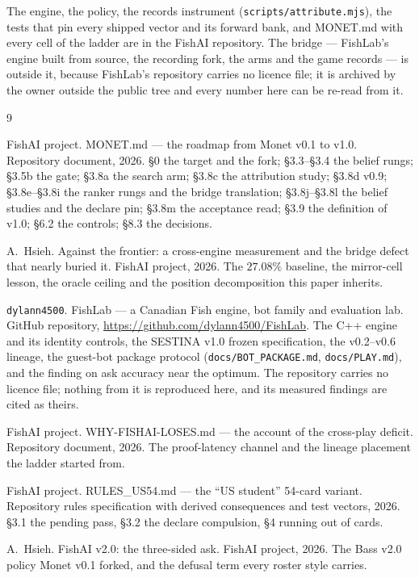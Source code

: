 \documentclass[11pt]{article}
\newcommand{\code}[1]{\texttt{#1}}
\newcommand{\monet}{MONET.md}
\begin{document}
The engine, the policy, the records instrument (\code{scripts/attribute.mjs}), the tests that pin
every shipped vector and its forward bank, and \monet{} with every cell of the ladder are in the
FishAI repository. The bridge --- FishLab's engine built from source, the recording fork, the arms and
the game records --- is outside it, because FishLab's repository carries no licence file; it is
archived by the owner outside the public tree and every number here can be re-read from it.

\begin{thebibliography}{9}
\footnotesize

FishAI project. MONET.md --- the roadmap from Monet v0.1 to v1.0. Repository document, 2026.
\S0 the target and the fork; \S3.3--\S3.4 the belief rungs; \S3.5b the gate; \S3.8a the search
arm; \S3.8c the attribution study; \S3.8d v0.9; \S3.8e--\S3.8i the ranker rungs and the bridge
translation; \S3.8j--\S3.8l the belief studies and the declare pin; \S3.8m the acceptance read;
\S3.9 the definition of v1.0; \S6.2 the controls; \S8.3 the decisions.

A.~Hsieh. Against the frontier: a cross-engine measurement and the bridge defect that nearly buried
it. FishAI project, 2026. The $27.08\%$ baseline, the mirror-cell lesson, the oracle ceiling and the
position decomposition this paper inherits.

\code{dylann4500}. FishLab --- a Canadian Fish engine, bot family and evaluation lab. GitHub
repository, \url{https://github.com/dylann4500/FishLab}. The C++ engine and its identity controls,
the SESTINA v1.0 frozen specification, the v0.2--v0.6 lineage, the guest-bot package protocol
(\code{docs/BOT\_PACKAGE.md}, \code{docs/PLAY.md}), and the finding on ask accuracy near the optimum.
The repository carries no licence file; nothing from it is reproduced here, and its measured
findings are cited as theirs.

FishAI project. WHY-FISHAI-LOSES.md --- the account of the cross-play deficit. Repository document,
2026. The proof-latency channel and the lineage placement the ladder started from.

FishAI project. RULES\_US54.md --- the ``US student'' 54-card variant. Repository rules
specification with derived consequences and test vectors, 2026. \S3.1 the pending pass, \S3.2 the
declare compulsion, \S4 running out of cards.

A.~Hsieh. FishAI v2.0: the three-sided ask. FishAI project, 2026. The Bass v2.0 policy Monet v0.1
forked, and the defusal term every roster style carries.

\end{thebibliography}
\end{document}
